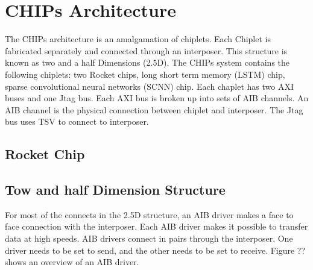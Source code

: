 \documentclass[../main.tex]{subfiles}
\begin{document}
\section{CHIPs Architecture}
The CHIPs architecture is an amalgamation of chiplets. Each Chiplet is fabricated separately and connected through an interposer. This structure is known as two and a half Dimensions (2.5D). The CHIPs system contains the following chiplets: two Rocket chips, long short term memory (LSTM) chip, sparse convolutional neural networks (SCNN) chip. Each chaplet has two AXI buses and one Jtag bus. Each AXI bus is broken up into sets of AIB channels. An AIB channel is the physical connection between chiplet and interposer. The Jtag bus uses TSV to connect to interposer.  



\subsection{Rocket Chip}

\subsection{Tow and half Dimension Structure}
For most of the connects in the 2.5D structure, an AIB driver makes a face to face connection with the interposer. Each AIB driver makes it possible to transfer data at high speeds. AIB drivers connect in pairs through the interposer. One driver needs to be set to send, and the other needs to be set to receive. Figure ?? shows an overview of an AIB driver. 
\end{document}
